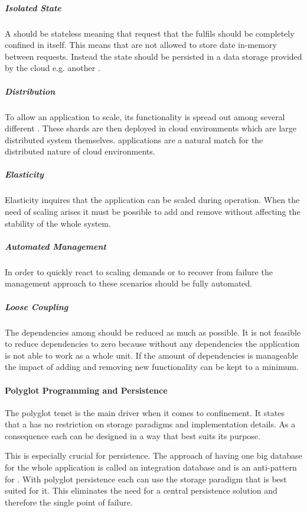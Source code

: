 \subparagraph{Isolated State}
A \ms{} should be stateless meaning that request that the \ms{} fulfils should
be completely confined in itself. This means that \mss{} are not allowed to
store date in-memory between requests. Instead the state should be persisted in
a data storage provided by the cloud e.g. another \ms{}.

\subparagraph{Distribution}
To allow an application to scale, its functionality is spread out among several
different \mss{}. These shards are then deployed in cloud environments which are
large distributed system themselves. \ms{} applications are a natural match for
the distributed nature of cloud environments.

\subparagraph{Elasticity}
Elasticity inquires that the application can be scaled during operation. When
the need of scaling arises it must be possible to add and remove \mss{} without
affecting the stability of the whole system.

\subparagraph{Automated Management}
In order to quickly react to scaling demands or to recover from failure the
management approach to these scenarios should be fully automated.

\subparagraph{Loose Coupling}

The dependencies among \mss{} should be reduced as much as possible. It is not
feasible to reduce dependencies to zero because without any dependencies the
application is not able to work as a whole unit. If the amount of dependencies
is manageable the impact of adding and removing new functionality can be kept
to a minimum.

\paragraph{Polyglot Programming and Persistence}

The polyglot tenet is the main driver when it comes to \ms{} confinement. It
states that a \ms{} has no restriction on storage paradigms and implementation
details. As a consequence each \ms{} can be designed in a way that best suits
its purpose.

This is especially crucial for persistence. The approach of having one big
database for the whole \ms{} application is called an integration database and
is an anti-pattern for \mss{}. With polyglot persistence each \ms{} can use the
storage paradigm that is best suited for it. This eliminates the need for a
central persistence solution and therefore the single point of failure.

